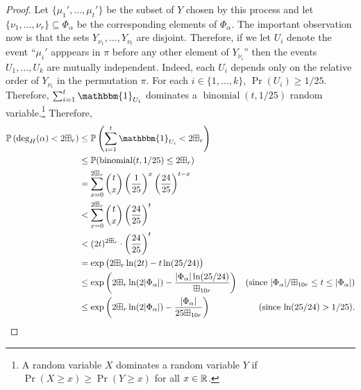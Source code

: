\documentclass{patmorin}
\newcommand{\vol}[1]{\boxplus_{#1}}
\DeclareMathOperator{\binomial}{binomial}
\begin{document}
\begin{proof}
  Let $\{\mu_1',\ldots,\mu_t'\}$ be the subset of $Y$ chosen by this process and let $\{\nu_1,\ldots,\nu_r\}\subseteq\Phi_\alpha$ be the corresponding elements of $\Phi_\alpha$.  The important observation now is that the sets $Y_{\nu_1},\ldots,Y_{\nu_t}$ are disjoint.  Therefore, if we let $U_i$ denote the event ``$\mu_i'$ apppears in $\pi$ before any other element of $Y_{\nu_i}$'' then the events $U_1,\ldots,U_k$ are mutually independent.  Indeed, each $U_i$ depends only on the relative order of $Y_{\nu_i}$ in the  permutation $\pi$.  For each $i\in\{1,\ldots,k\}$, $\Pr(U_i)\ge 1/25$.  Therefore, $\sum_{i=1}^t \mathbbm{1}_{U_i}$ dominates a $\binomial(t,1/25)$ random variable.\footnote{A random variable $X$ dominates a random variable $Y$ if $\Pr(X\ge x)\ge \Pr(Y\ge x)$ for all $x\in\mathbb{R}$.}  Therefore,
  \begin{align}
    \Pr\left(\deg_H(\alpha)< 2\vol{r}\right)
    & \le \Pr\left(\sum_{i=1}^t \mathbbm{1}_{U_i} < 2\vol{r}\right) \notag \\
    & \le \Pr(\binomial(t,1/25)\le 2\vol{r}) \notag \\
    & = \sum_{x=0}^{2\vol{r}} \binom{t}{x}\left(\frac{1}{25}\right)^x\left(\frac{24}{25}\right)^{t-x} \notag \\
    & < \sum_{x=0}^{2\vol{r}} \binom{t}{x}\left(\frac{24}{25}\right)^{t} \notag \\
    & < (2t)^{2\vol{r}}\cdot\left(\frac{24}{25}\right)^{t} \notag \\
    & = \exp\big({2\vol{r}}\ln(2t)-t\ln(25/24)\big) \notag \\
    & \le \exp\left({2\vol{r}}\ln(2|\Phi_\alpha|)-\frac{|\Phi_\alpha|\ln(25/24)}{\vol{10r}}\right)
      & \text{(since $|\Phi_\alpha|/\vol{10r} \le t \le |\Phi_\alpha|$)} \notag \\
    & \le \exp\left({2\vol{r}}\ln(2|\Phi_\alpha|)-\frac{|\Phi_\alpha|}{25\vol{10r}}\right)
      & \text{(since $\ln(25/24) > 1/25$).}
       \label{probability}
  \end{align}



\end{proof}
\end{document}
